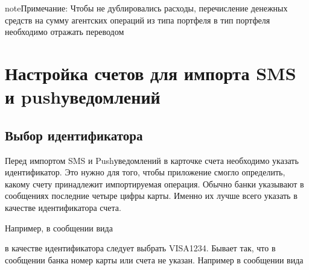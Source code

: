 \documentclass[a4paper,10pt,russian]{sphinxmanual}
\begin{document}
\noindent{}

\begin{sphinxadmonition}{note}{Примечание:}
\sphinxAtStartPar
Чтобы не дублировались расходы, перечисление денежных средств на сумму агентских операций из типа портфеля  в тип портфеля  необходимо отражать переводом
\end{sphinxadmonition}

\sphinxstepscope


\chapter{Настройка счетов для импорта SMS и push\sphinxhyphen{}уведомлений}
\label{\detokenize{account-identities:sms-push}}\label{\detokenize{account-identities:chapter-account-identities}}\label{\detokenize{account-identities::doc}}

\section{Выбор идентификатора}
\label{\detokenize{account-identities:id1}}
\sphinxAtStartPar
Перед импортом SMS и Push\sphinxhyphen{}уведомлений в карточке счета необходимо указать идентификатор. Это нужно для того,
чтобы приложение смогло определить, какому счету принадлежит импортируемая операция. Обычно банки
указывают  в сообщениях последние четыре цифры карты. Именно их лучше всего указать в качестве идентификатора счета.

\sphinxAtStartPar
Например, в сообщении вида

\begin{sphinxVerbatim}[commandchars=\\\{\}]
         
\end{sphinxVerbatim}

\sphinxAtStartPar
в качестве идентификатора следует выбрать VISA1234. Бывает так, что в сообщении банка номер карты или счета не указан.
Например в сообщении вида

\begin{sphinxVerbatim}[commandchars=\\\{\}]
    
\end{sphinxVerbatim}
\end{document}
